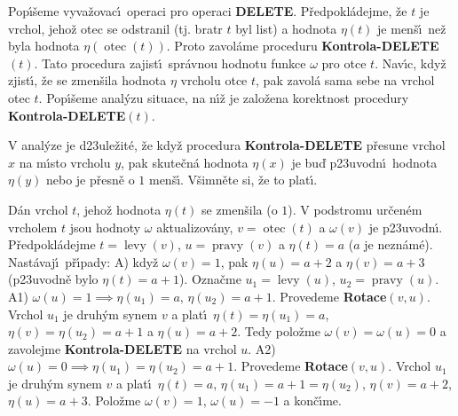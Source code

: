 \documentclass[a4paper,12pt]{article}
\DeclareMathOperator*{\otec}{otec}
\DeclareMathOperator*{\levy}{levy}
\DeclareMathOperator*{\pravy}{pravy}
\begin{document}
\flushpar Pop\'\i\v seme vyva\v zovac\'\i\ operaci pro operaci 
{\bf DELETE}.  P\v red\-po\-kl\'adejme, \v ze $t$ je vrchol, jeho\v z otec se 
odstranil (tj.  bratr $t$ byl list) a hodnota $\eta (t)$ je men\v s\'\i\ 
ne\v z byla hodnota $\eta (\otec(t))$.  Proto zavol\'ame proceduru 
{\bf Kontrola-DELETE$(t)$}.  Tato procedura zajist\'\i\ spr\'avnou 
hodnotu funkce $\omega$ pro otce $t$.  Nav\'\i c, kdy\v z zjist\'\i , \v ze se 
zmen\v sila hodnota $\eta$ vrcholu otce $t$, pak zavol\'a sama sebe 
na vrchol otec $t$. Pop\'\i\v seme anal\'yzu situace, na n\'\i\v z je 
zalo\v zena korektnost procedury {\bf Kontrola-DELETE$(t)$}.  
\medskip

\flushpar V anal\'yze je d\accent23ule\v zit\'e, \v ze kdy\v z procedura {\bf Kontrola-DELETE }
p\v resune vrchol $x$ na m\'\i sto vrcholu $y$, pak skute\v cn\'a hodnota $
\eta (x)$ 
je bu\v d p\accent23uvodn\'\i\ hodnota $\eta (y)$ nebo je p\v resn\v e o $
1$ men\v s\'\i . V\v simn\v ete si, \v ze to plat\'\i . 
\medskip

\flushpar D\'an vrchol $t$, jeho\v z hodnota $\eta (t)$ se zmen\v sila (o $
1$).  V 
podstromu ur\v cen\'em vrcholem $t$ jsou hodnoty $\omega$ aktualizov\'any, 
$v=\otec(t)$ a $\omega (v)$ je p\accent23uvodn\'\i .  P\v redpokl\'adejme 
$t=\levy(v)$, $u=\pravy(v)$ a $\eta (t)=a$ ($a$ je nezn\'am\'e).  Nast\'avaj\'\i\ 
p\v r\'\i pady:\newline 
A) kdy\v z $\omega (v)=1$, pak $\eta (u)=a+2$ a $\eta (v)=a+3$ (p\accent23uvodn\v e 
bylo $\eta (t)=a+1$).  Ozna\v cme $u_1=\levy(u)$, $u_2=\pravy(u)$.\newline 
A1) $\omega (u)=1\implies\eta (u_1)=a,\,\eta (u_2)=a+1$.  Provedeme 
{\bf Rotace$(v,u)$}.  
Vrchol $u_1$ je druh\'ym synem $v$ a plat\'\i\ $\eta (t)=\eta (u_
1)=a$, 
$\eta (v)=\eta (u_2)=a+1$ a $\eta (u)=a+2$.  Tedy polo\v zme $\omega 
(v)=\omega (u)=0$ a 
zavolejme {\bf Kontrola-DELETE} na vrchol $u$.\newline 
A2) $\omega (u)=0\implies\eta (u_1)=\eta (u_2)=a+1$. Provedeme 
{\bf Rotace$(v,u)$}. Vrchol $u_1$ je druh\'ym synem $v$ a plat\'\i\ 
$\eta (t)=a$, $\eta (u_1)=a+1=\eta (u_2)$, $\eta (v)=a+2$, $\eta 
(u)=a+3$. Polo\v zme 
$\omega (v)=1$, $\omega (u)=-1$ a kon\v c\'\i me.
\medskip
 
\end{document}
